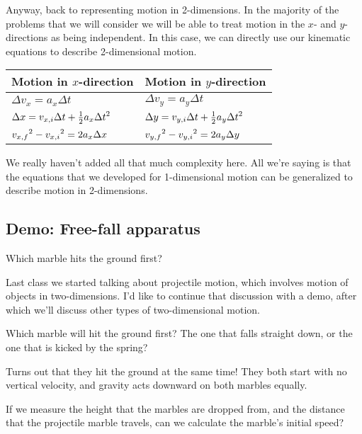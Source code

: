 \vspace{6cm}

Anyway, back to representing motion in 2-dimensions. In the majority of the problems that we will consider we will be able to treat motion in the $x$- and $y$- directions as being independent. In this case, we can directly use our kinematic equations to describe 2-dimensional motion.

\begin{table}[h]
\begin{tabular}{ll}
\textbf{Motion in $x$-direction}\hspace{3cm} & \textbf{Motion in $y$-direction}\\
\hline
$\Delta{v_x}=a_x\Delta{t}$ & $\Delta{v_y}=a_y\Delta{t}$\\
$\Delta{x}=v_{x,i}\Delta{t}+\frac{1}{2}a_x\Delta{t}\displaystyle^2$ & $\Delta{y}=v_{y,i}\Delta{t}+\frac{1}{2}a_y\Delta{t}\displaystyle^2$\\
$v_{x,f}\displaystyle^2-v_{x,i}\displaystyle^2=2a_x\Delta{x}$ & $v_{y,f}\displaystyle^2-v_{y,i}\displaystyle^2=2a_y\Delta{y}$\\
\hline
\end{tabular}
\end{table}

We really haven't added all that much complexity here. All we're saying is that the equations that we developed for 1-dimensional motion can be generalized to describe motion in 2-dimensions.


\subsection{Demo: Free-fall apparatus}
Which marble hits the ground first?

Last class we started talking about projectile motion, which involves motion of objects in two-dimensions. I'd like to continue that discussion with a demo, after which we'll discuss other types of two-dimensional motion.

Which marble will hit the ground first? The one that falls straight down, or the one that is kicked by the spring?

Turns out that they hit the ground at the same time! They both start with no vertical velocity, and gravity acts downward on both marbles equally.

If we measure the height that the marbles are dropped from, and the distance that the projectile marble travels, can we calculate the marble's initial speed?

